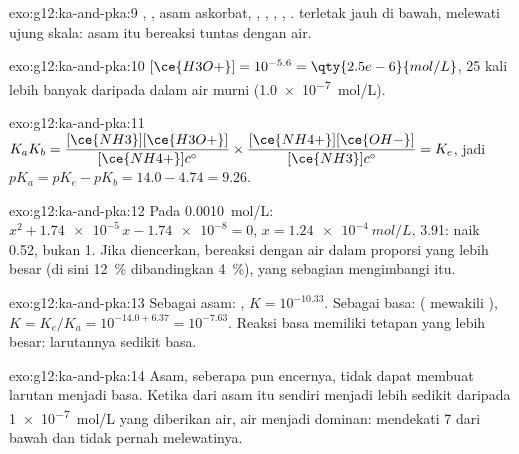 \begin{solution}{exo:g12:ka-and-pka:9}
, , asam askorbat, , ,
, , .  terletak jauh di bawah,
melewati ujung skala: asam itu bereaksi tuntas dengan air.
\end{solution}

\begin{solution}{exo:g12:ka-and-pka:10}
$[\ce{H3O+}] = 10^{-5.6} = \qty{2.5e-6}{mol/L}$, 25 kali lebih banyak
daripada dalam air murni (\qty{1.0e-7}{mol/L}).
\end{solution}

\begin{solution}{exo:g12:ka-and-pka:11}
$K_a K_b = \dfrac{[\ce{NH3}][\ce{H3O+}]}{[\ce{NH4+}]c^\circ} \times
\dfrac{[\ce{NH4+}][\ce{OH-}]}{[\ce{NH3}]c^\circ} = K_e$, jadi
$pK_a = pK_e - pK_b = 14.0 - 4.74 = 9.26$.
\end{solution}

\begin{solution}{exo:g12:ka-and-pka:12}
Pada \qty{0.0010}{mol/L}: $x^2 + \num{1.74e-5}\,x - \num{1.74e-8} = 0$,
$x = \qty{1.24e-4}{mol/L}$,  3.91: naik 0.52, bukan 1. Jika
diencerkan,  bereaksi dengan air dalam proporsi yang lebih
besar (di sini \qty{12}{\percent} dibandingkan \qty{4}{\percent}), yang
sebagian mengimbangi  itu.
\end{solution}

\begin{solution}{exo:g12:ka-and-pka:13}
Sebagai asam: , $K = 10^{-10.33}$.
Sebagai basa:  ( mewakili
), $K = K_e/K_a = 10^{-14.0+6.37}
= 10^{-7.63}$. Reaksi basa memiliki tetapan yang lebih besar: larutannya
sedikit basa.
\end{solution}

\begin{solution}{exo:g12:ka-and-pka:14}
Asam, seberapa pun encernya, tidak dapat membuat larutan menjadi basa.
Ketika  dari asam itu sendiri menjadi lebih sedikit daripada
\qty{1e-7}{mol/L} yang diberikan air,  air menjadi dominan: 
mendekati 7 dari bawah dan tidak pernah melewatinya.
\end{solution}

